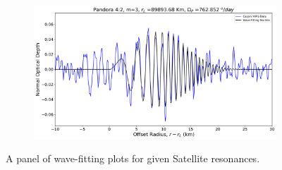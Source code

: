 \documentclass{article}
\begin{document}
\begin{figure}[h]
    \begin{subfigure}{0.35\linewidth}
        \includegraphics[width=\linewidth]{pandora_42_wavefit.png}
        \label{fig:pandora42}
    \end{subfigure}

    \caption{A panel of wave-fitting plots for given Satellite resonances.}
    \label{fig:common-label}
\end{figure}

\end{document}
